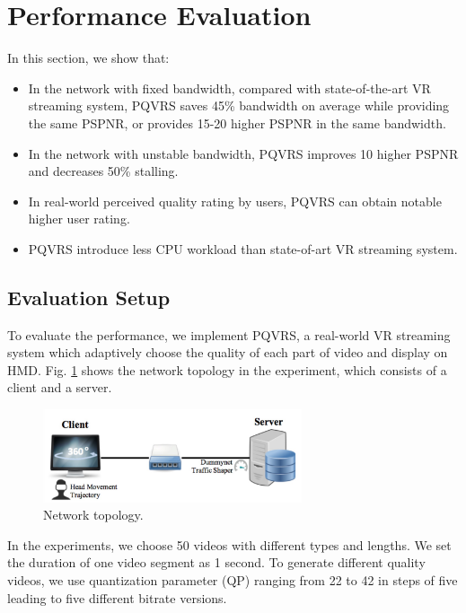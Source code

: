 \section{Performance Evaluation}

In this section, we show that:

\begin{itemize}

\item In the network with fixed bandwidth, compared with state-of-the-art VR streaming system, PQVRS saves 45\% bandwidth on average while providing the same PSPNR, or provides 15-20 higher PSPNR in the same bandwidth.

\item In the network with unstable bandwidth, PQVRS improves 10 higher PSPNR and decreases 50\% stalling.

\item In real-world perceived quality rating by users, PQVRS can obtain notable higher user rating.

\item PQVRS introduce less CPU workload than state-of-art VR streaming system.

\end{itemize}

\subsection{Evaluation Setup}

To evaluate the performance, we implement PQVRS, a real-world VR streaming system which adaptively choose the quality of each part of video and display on HMD. Fig. \ref{network} shows the network topology in the experiment, which consists of a client and a server.

\begin{figure}
  \centering
  \includegraphics[width=3in]{images/network.jpg}
  \caption{Network topology.}
  \label{network}
  \end{figure}

In the experiments, we choose 50 videos with different types and lengths. We set the duration of one video segment as 1 second. To generate different quality videos, we use quantization parameter (QP) ranging from 22 to 42 in steps of five leading to five different bitrate versions. 


